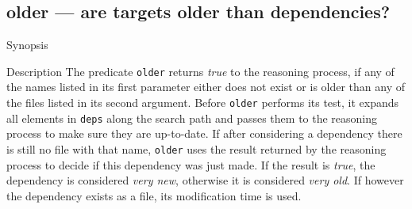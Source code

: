 \documentclass[11pt,bibtotoc,idxtotoc]{scrreprt}
\begin{document}
\subsection{older --- are targets older than dependencies?}
\label{pred:older}
\begin{Describe}
\item[Synopsis]  
\item[Description] The predicate \texttt{older} returns \textit{true}
  to the reasoning process, if any of the names listed in its first
  parameter either does not exist or is older than any of the files
  listed in its second argument. Before \texttt{older} performs its
  test, it expands all elements in \texttt{deps} along the search path
  and passes them to the reasoning process to make sure they are
  up-to-date. If after considering a dependency there is still no file
  with that name, \texttt{older} uses the result returned by the
  reasoning process to decide if this dependency was just made. If the
  result is \textit{true}, the dependency is considered \textit{very
    new}, otherwise it is considered \textit{very old}. If however the
  dependency exists as a file, its modification time is used.
\end{Describe}

\end{document}
